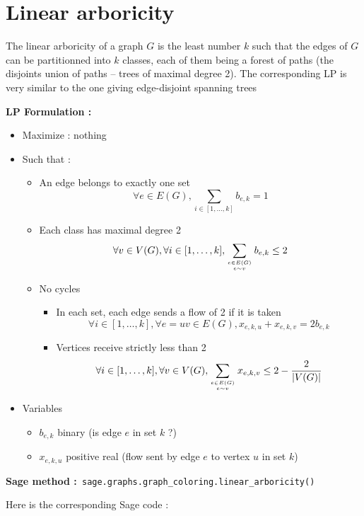 
\section{Linear arboricity}
The linear arboricity of a graph $G$ is the least number $k$ such that the edges of $G$ can be partitionned into $k$ classes, each of them being a forest of paths (the disjoints union of paths -- trees of maximal degree 2). The corresponding LP is very similar to the one giving edge-disjoint spanning trees

{\bf LP Formulation :}
\begin{itemize}
\item Maximize : nothing
\item Such that :
  \begin{itemize}
  \item An edge belongs to exactly one set
    $$\forall e\in E(G), \sum_{i\in [1,\dots,k]} b_{e,k}  = 1$$
  \item Each class has maximal degree 2
    $$\forall v\in V(G), \forall i\in [1,\dots,k], \sum_{e\in E(G)\atop e\sim v} b_{e,k}\leq 2$$
  \item No cycles
    \begin{itemize}
    \item In each set, each edge sends a flow of 2 if it is taken
      $$\forall i\in [1,\dots,k], \forall e=uv\in E(G), x_{e,k,u} + x_{e,k,v} = 2b_{e,k}$$
    \item Vertices receive strictly less than 2
      $$\forall i\in [1,\dots,k], \forall v\in V(G), \sum_{e\in E(G)\atop e\sim v}x_{e,k,v}\leq 2-\frac 2 {|V(G)|}$$
    \end{itemize}
  \end{itemize}
\item Variables
  \begin{itemize}
  \item $b_{e,k}$ binary (is edge $e$ in set $k$ ?)
  \item $ x_{e,k,u}$ positive real (flow sent by edge $e$ to vertex $u$ in set $k$)
  \end{itemize}
\end{itemize}

{\bf Sage method :}\verb! sage.graphs.graph_coloring.linear_arboricity()!

Here is the corresponding Sage code :

